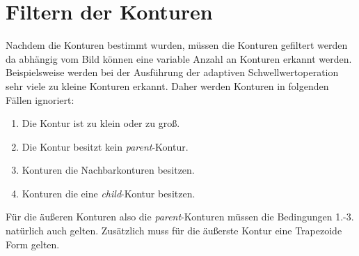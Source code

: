 \section{Filtern der Konturen}
Nachdem die Konturen bestimmt wurden, müssen die Konturen gefiltert werden da abhängig vom Bild können eine variable Anzahl an Konturen
erkannt werden. Beispielsweise werden bei der Ausführung der adaptiven Schwellwertoperation sehr viele zu kleine Konturen erkannt. Daher werden Konturen in folgenden Fällen ignoriert:
\begin{enumerate}
	\item Die Kontur ist zu klein oder zu groß.
	\item Die Kontur besitzt kein \emph{parent}-Kontur.
	\item Konturen die Nachbarkonturen besitzen.
	\item Konturen die eine \emph{child}-Kontur besitzen.
\end{enumerate}
Für die äußeren Konturen also die \emph{parent}-Konturen müssen die Bedingungen 1.-3. natürlich auch gelten. Zusätzlich muss für die äußerste Kontur eine Trapezoide Form gelten.

